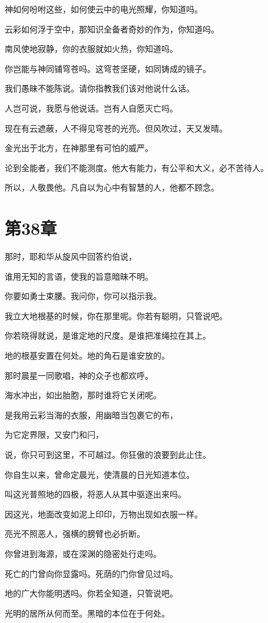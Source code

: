 \documentclass[12pt,oneside]{book}
\begin{document}
神如何吩咐这些，如何使云中的电光照耀，你知道吗。

云彩如何浮于空中，那知识全备者奇妙的作为，你知道吗。

南风使地寂静，你的衣服就如火热，你知道吗。

你岂能与神同铺穹苍吗。这穹苍坚硬，如同铸成的镜子。

我们愚昧不能陈说。请你指教我们该对他说什么话。

人岂可说，我愿与他说话。岂有人自愿灭亡吗。

现在有云遮蔽，人不得见穹苍的光亮。但风吹过，天又发晴。

金光出于北方，在神那里有可怕的威严。

论到全能者，我们不能测度。他大有能力，有公平和大义，必不苦待人。

所以，人敬畏他。凡自以为心中有智慧的人，他都不顾念。


\chapter{第38章}
那时，耶和华从旋风中回答约伯说，

谁用无知的言语，使我的旨意暗昧不明。

你要如勇士束腰。我问你，你可以指示我。

我立大地根基的时候，你在那里呢。你若有聪明，只管说吧。

你若晓得就说，是谁定地的尺度。是谁把准绳拉在其上。

地的根基安置在何处。地的角石是谁安放的。

那时晨星一同歌唱，神的众子也都欢呼。

海水冲出，如出胎胞，那时谁将它关闭呢。

是我用云彩当海的衣服，用幽暗当包裹它的布，

为它定界限，又安门和闩，

说，你只可到这里，不可越过。你狂傲的浪要到此止住。

你自生以来，曾命定晨光，使清晨的日光知道本位。

叫这光普照地的四极，将恶人从其中驱逐出来吗。

因这光，地面改变如泥上印印，万物出现如衣服一样。

亮光不照恶人，强横的膀臂也必折断。

你曾进到海源，或在深渊的隐密处行走吗。

死亡的门曾向你显露吗。死荫的门你曾见过吗。

地的广大你能明透吗。你若全知道，只管说吧。

光明的居所从何而至。黑暗的本位在于何处。
\end{document}
